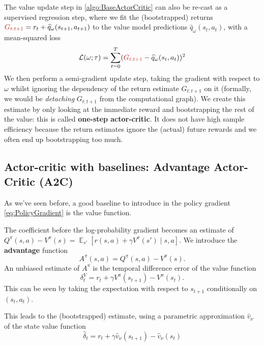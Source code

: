 \documentclass[12pt]{report}
\DeclareMathOperator{\EE}{\mathbb{E}}
\newcommand{\calL}{\mathcal{L}}
\newcommand{\redfont}{\color{darkred}}
\begin{document}
The value update step in \cref{algo:BaseActorCritic} can also be re-cast as a supervised regression step, where we fit the (bootstrapped) returns ${\redfont G_{t:t+1}} = r_t + \widehat{q}_\omega(s_{t+1},a_{t+1})$ to the value model predictions $\widehat{q}_\omega(s_t,a_t)$, with a mean-squared loss
\[
	\calL(\omega; \tau) =
	\sum_{t=0}^T ({\redfont G_{t:t+1}} - \widehat{q}_{\omega}(s_t,a_t))^2
\]
We then perform a semi-gradient update step, taking the gradient with respect to $\omega$ whilst ignoring the dependency of the return estimate $G_{t:t+1}$ on it (formally, we would be \textit{detaching} $G_{t:t+1}$ from the computational graph). We create this estimate by only looking at the immediate reward and bootstrapping the rest of the value: this is called \textbf{one-step actor-critic}. It does not have high sample efficiency because the return estimates ignore the (actual) future rewards and we often end up bootstrapping too much.


\subsection{Actor-critic with baselines: Advantage Actor-Critic (A2C)}

As we've seen before, a good baseline to introduce in the policy gradient \eqref{eq:PolicyGradient} is the value function.

The coefficient before the log-probability gradient becomes an estimate of $Q^\pi(s,a) - V^\pi(s) = \EE_{s'}[r(s,a) + \gamma V^\pi(s')\mid s,a]$. We introduce the \textbf{advantage} function
\[
	A^\pi(s,a) = Q^\pi(s,a) - V^\pi(s).
\]
An unbiased estimate of $A^\pi$ is the temporal difference error of the value function
\[
	\delta_t^V = r_t + \gamma V^\pi(s_{t+1}) - V^\pi(s_t).
\]
This can be seen by taking the expectation with respect to $s_{t+1}$ conditionally on $(s_t,a_t)$.

This leads to the (bootstrapped) estimate, using a parametric approximation $\widehat{v}_\nu$ of the state value function
\[
	\widehat{\delta}_t = r_t + \gamma\widehat{v}_\nu(s_{t+1}) - \widehat{v}_\nu(s_t)
\]


\nocite{*}
\printbibliography
\end{document}
